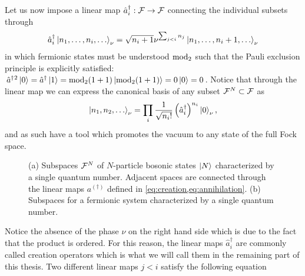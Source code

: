 Let us now impose a linear map $\hat a^\dag_i:\mathcal{F}\rightarrow\mathcal{F}$ connecting the individual subsets through
\begin{align}
    \hat a^\dag_i\ket{n_1,\dots,n_i,\dots}_\nu = \sqrt{n_i+1}\nu^{\sum_{j<i}n_j}\ket{n_1,\dots,n_i+1,\dots}_\nu
    \label{eq:creation}
\end{align}
in which fermionic states must be understood ${\rm mod}_2$ such that the Pauli exclusion principle is explicitly satisfied: $\hat a^\dag{}^2\ket{0}=\hat a^\dag\ket{1}={\rm mod}_2(1+1)\ket{{\rm mod}_2(1+1)} = 0\ket{0} = 0$.
Notice that through the linear map we can express the canonical basis of any subset $\mathcal{F}^N\subset\mathcal{F}$ as
\begin{align}
    \ket{n_1,n_2,\dots}_\nu = \prod_i\frac1{\sqrt{n_i!}}\left(\hat a^\dag_i\right)^{n_i}\ket{0}_\nu,
    \label{eq:Fock_basis}
\end{align}
and as such have a tool which promotes the vacuum to any state of the full Fock space.
\begin{figure}
    \centering
    \hfil
    \caption{(a) Subspaces $\mathcal{F}^N$ of $N$-particle bosonic states $\ket{N}$ characterized by a single quantum number. Adjacent spaces are connected through the linear maps $a^{(\dag)}$ defined in \cref{eq:creation,eq:annihilation}. (b) Subspaces for a fermionic system characterized by a single quantum number.}
    \label{fig:fock_spaces}
\end{figure}
Notice the absence of the phase $\nu$ on the right hand side which is due to the fact that the product is ordered.
For this reason, the linear maps $\hat a^\dag_i$ are commonly called creation operators which is what we will call them in the remaining part of this thesis.
Two different linear maps $j<i$ satisfy the following equation
